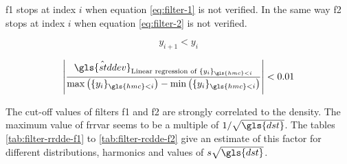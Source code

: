 %
%

\bigskip

\gls{f1} stops at index \( i \) when equation \eqref{eq:filter-1} is not verified.
In the same way \gls{f2} stops at index \( i \) when equation \eqref{eq:filter-2} is not verified.

\begin{equation}\label{eq:filter-1}
y_{i+1} < y_i
\end{equation}

\begin{equation}\label{eq:filter-2}
\left| \frac{\hat{\gls{stddev}}_{\text{Linear regression of } \{ y_i \}_{\gls{hmc}<i}}}{\max \left( \{ y_i \}_{\gls{hmc}<i} \right) - \min \left( \{ y_i \}_{\gls{hmc}<i} \right)} \right| < 0.01
\end{equation}

\bigskip

The cut-off values of filters \gls{f1} and \gls{f2} are strongly correlated to the density.
The maximum value of \gls{frrvar} seems to be a multiple of \( 1 / \sqrt{\gls{dst}} \).
The tables \ref{tab:filter-rrdde-f1} to \ref{tab:filter-rcdde-f2} give an estimate of this factor for different distributions, harmonics and values of \( s \sqrt{\gls{dst}} \).

\bigskip

%
\label{tab:filter-rrdde-f1}

\bigskip

%
\label{tab:filter-rrdde-f2}

\bigskip

%
\label{tab:filter-rcdde-f1}

\bigskip

%
\label{tab:filter-rcdde-f2}

